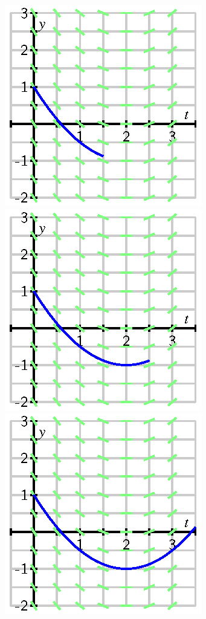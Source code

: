 \begin{center}
    \includegraphics{figures/7_2_field_31.eps} \hspace{0.25in}
    \includegraphics{figures/7_2_field_32.eps} \hspace{0.25in}
    \includegraphics{figures/7_2_field_33.eps}
\end{center}

